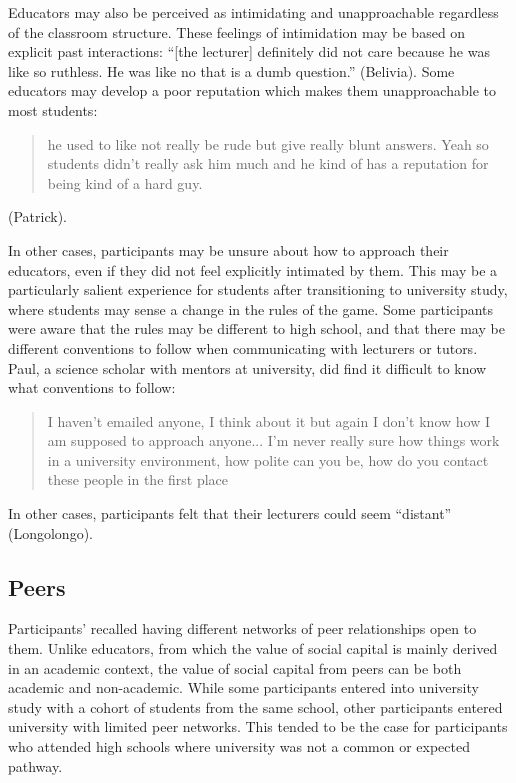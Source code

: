 Educators may also be perceived as intimidating and unapproachable regardless of the classroom structure. These feelings of intimidation may be based on explicit past interactions: ``[the lecturer] definitely did not care because he was like so ruthless. He was like no that is a dumb question.'' (Belivia). Some educators may develop a poor reputation which makes them unapproachable to most students: \blockquote{he used to like not really be rude but give really blunt answers. Yeah so students didn't really ask him much and he kind of has a reputation for being kind of a hard guy.} (Patrick).

In other cases, participants may be unsure about how to approach their educators, even if they did not feel explicitly intimated by them. This may be a particularly salient experience for students after transitioning to university study, where students may sense a change in the rules of the game. Some participants were aware that the rules may be different to high school, and that there may be different conventions to follow when communicating with lecturers or tutors. Paul, a science scholar with mentors at university, did find it difficult to know what conventions to follow:
\blockquote{I haven't emailed anyone, I think about it but again I don't know how I am supposed to approach anyone... I'm never really sure how things work in a university environment, how polite can you be, how do you contact these people in the first place}. In other cases, participants felt that their lecturers could seem ``distant'' (Longolongo).  




\subsection{Peers}
Participants' recalled having different networks of peer relationships open to them. Unlike educators, from which the value of social capital is mainly derived in an academic context, the value of social capital from peers can be both academic and non-academic. While some participants entered into university study with a cohort of students from the same school, other participants entered university with limited peer networks. This tended to be the case for participants who attended high schools where university was not a common or expected pathway. 

